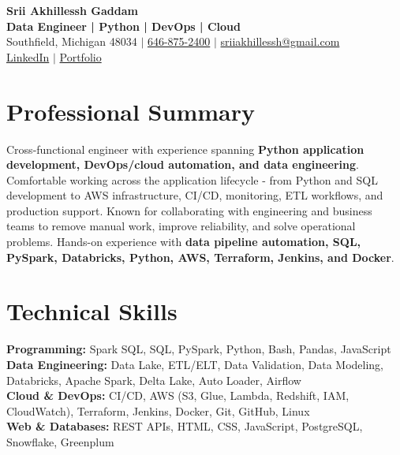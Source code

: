 \documentclass[letterpaper,10pt]{article}
\begin{document}
\fontsize{9.35pt}{10.45pt}\selectfont

\begin{center}
    {\LARGE \textbf{Srii Akhillessh Gaddam}} \\[-1pt]
    \textbf{Data Engineer | Python | DevOps | Cloud} \\[2pt]
    Southfield, Michigan 48034 $|$
    \href{tel:6468752400}{646-875-2400} $|$
    \href{mailto:sriiakhillessh@gmail.com}{sriiakhillessh@gmail.com} \\[1pt]
    \href{https://www.linkedin.com/in/srii-akhiilessh-gaddam-b48668191/}{LinkedIn} $|$
    \href{https://sriiakhillesshg.github.io/portfolio/}{Portfolio}
\end{center}
\vspace{-8pt}

\section{Professional Summary}
\small{Cross-functional engineer with experience spanning \textbf{Python application development, DevOps/cloud automation, and data engineering}. Comfortable working across the application lifecycle - from Python and SQL development to AWS infrastructure, CI/CD, monitoring, ETL workflows, and production support. Known for collaborating with engineering and business teams to remove manual work, improve reliability, and solve operational problems. Hands-on experience with \textbf{data pipeline automation, SQL, PySpark, Databricks, Python, AWS, Terraform, Jenkins, and Docker}.}

\section{Technical Skills}
\small{
\textbf{Programming:} Spark SQL, SQL, PySpark, Python, Bash, Pandas, JavaScript \\
\textbf{Data Engineering:} Data Lake, ETL/ELT, Data Validation, Data Modeling, Databricks, Apache Spark, Delta Lake, Auto Loader, Airflow \\
\textbf{Cloud \& DevOps:} CI/CD, AWS (S3, Glue, Lambda, Redshift, IAM, CloudWatch), Terraform, Jenkins, Docker, Git, GitHub, Linux \\
\textbf{Web \& Databases:} REST APIs, HTML, CSS, JavaScript, PostgreSQL, Snowflake, Greenplum
}
\end{document}
